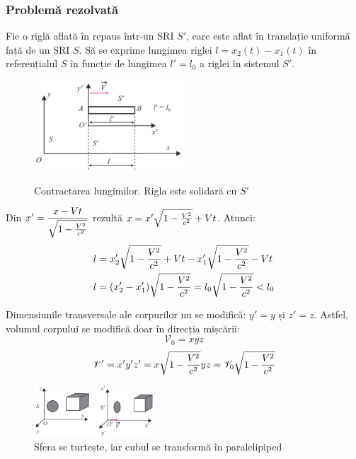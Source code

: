 \subsubsection*{Problemă rezolvată}
\vspace{0.5cm}

Fie o riglă aflată în repaus într-un SRI $S'$, care este aflat în translație
uniformă față de un SRI $S$. Să se exprime lungimea riglei \( l = x_2(t) - x_1(t) \)
în referențialul $S$ în funcție de lungimea \( l' = l_0 \)
a riglei în sistemul $S'$.

\begin{figure}[h]
    \centering
    \includegraphics[width=0.5\textwidth]{fig/rigla} \\
    \caption{Contractarea lungimilor. Rigla este solidară cu $S'$}
\end{figure}

Din \( x' = \dfrac{x - Vt}{\sqrt{1 - \frac{V^2}{c^2}}} \)
rezultă \( x = x' \sqrt{1 - \frac{V^2}{c^2}} + Vt \). Atunci:
\begin{align*}
    l &= x_2' \sqrt{1 - \frac{V^2}{c^2}} + Vt - x_1' \sqrt{1 - \frac{V^2}{c^2}} - Vt \\
    l &= (x_2' - x_1') \sqrt{1 - \frac{V^2}{c^2}} = l_0 \sqrt{1 - \frac{V^2}{c^2}} < l_0
\end{align*}

\parbreak

Dimensiunile transversale ale corpurilor nu se modifică: \( y' = y \) și \( z' = z \).
Astfel, volumul corpului se modifică doar în direcția mișcării:
\[ \mathscr{V}_0 = xyz \]
\[ \mathscr{V}' = x'y'z' = x\sqrt{1 - \frac{V^2}{c^2}} yz = \mathscr{V}_0 \sqrt{1 - \frac{V^2}{c^2}} \]

\begin{figure}
    \centering
    \includegraphics[width=0.4\textwidth]{fig/turtit.png}
    \caption{Sfera se turtește, iar cubul \linebreak se transformă în paralelipiped}
\end{figure}

